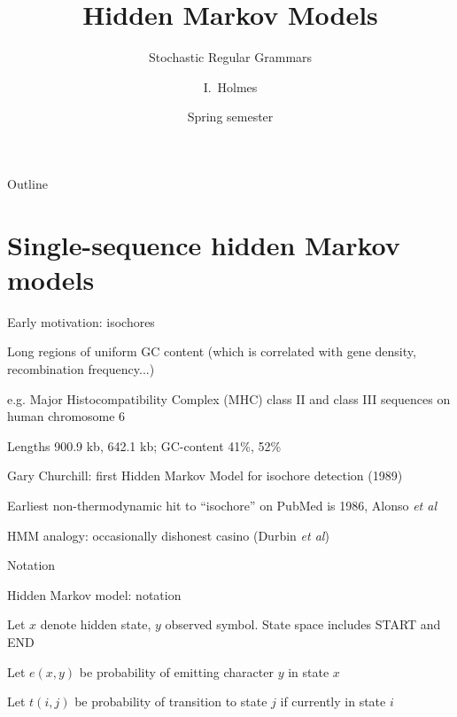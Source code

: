 \documentclass{beamer}
\title[HMMs] %
{Hidden Markov Models}
\subtitle
{Stochastic Regular Grammars} %
\author%
{I.~Holmes} %
\institute[University of California, Berkeley] %
{
  Department of Bioengineering\\
  University of California, Berkeley}
\date%
{Spring semester}
\begin{document}
\begin{frame}
  \titlepage
\end{frame}

\begin{frame}{Outline}
  \tableofcontents
\end{frame}


\section{Single-sequence hidden Markov models}



\begin{frame}{}

\itemb
\item Early motivation: isochores
 \itemb
 \item Long regions of uniform GC content (which is correlated with gene density, recombination frequency...)
  \itemb
  \item e.g. Major Histocompatibility Complex (MHC) class II and class III sequences on human chromosome 6
  \item Lengths 900.9 kb, 642.1 kb; GC-content 41\%, 52\%
  \iteme
 \item Gary Churchill: first Hidden Markov Model for isochore detection (1989)
 \item Earliest non-thermodynamic hit to ``isochore'' on PubMed is 1986, Alonso {\em et al}
 \item HMM analogy: occasionally dishonest casino (Durbin {\em et al})
 \iteme
\iteme
\end{frame}

\begin{frame}{Notation}
\itemb
\item Hidden Markov model: notation
 \itemb
 \item Let $x$ denote hidden state, $y$ observed symbol. State space includes START and END
 \item Let $e(x,y)$ be probability of emitting character $y$ in state $x$
 \item Let $t(i,j)$ be probability of transition to state $j$ if currently in state $i$
 \iteme
\iteme
\end{frame}
\end{document}
